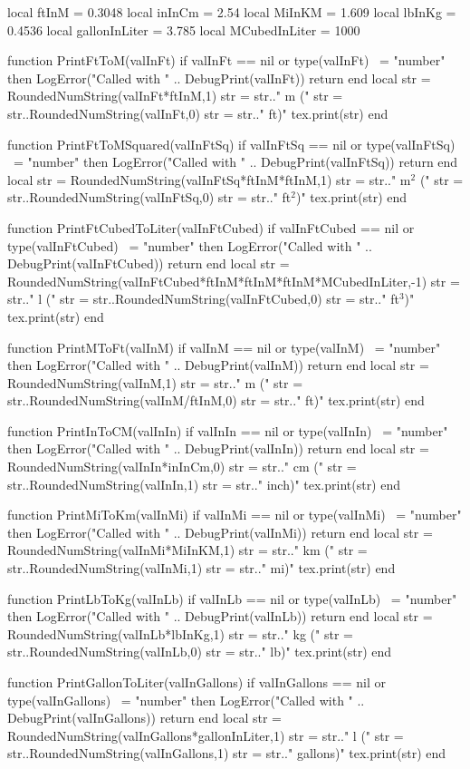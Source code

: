 \begin{luacode}
	local ftInM = 0.3048
	local inInCm = 2.54
	local MiInKM = 1.609
	local lbInKg = 0.4536
	local gallonInLiter = 3.785
	local MCubedInLiter = 1000
	
	function PrintFtToM(valInFt)
		if valInFt == nil or type(valInFt) ~= "number" then
			LogError("Called with " .. DebugPrint(valInFt))
			return
		end
		local str = RoundedNumString(valInFt*ftInM,1)
		str = str.." m ("
		str = str..RoundedNumString(valInFt,0)
		str = str.." ft)"
		tex.print(str)
	end

	function PrintFtToMSquared(valInFtSq)
		if valInFtSq == nil or type(valInFtSq) ~= "number" then
			LogError("Called with " .. DebugPrint(valInFtSq))
			return
		end
		local str = RoundedNumString(valInFtSq*ftInM*ftInM,1)
		str = str.." m$^2$ ("
		str = str..RoundedNumString(valInFtSq,0)
		str = str.." ft$^2$)"
		tex.print(str)
	end

	function PrintFtCubedToLiter(valInFtCubed)
		if valInFtCubed == nil or type(valInFtCubed) ~= "number" then
			LogError("Called with " .. DebugPrint(valInFtCubed))
			return
		end
		local str = RoundedNumString(valInFtCubed*ftInM*ftInM*ftInM*MCubedInLiter,-1)
		str = str.." l ("
		str = str..RoundedNumString(valInFtCubed,0)
		str = str.." ft$^3$)"
		tex.print(str)
	end
	
	function PrintMToFt(valInM)
		if valInM == nil or type(valInM) ~= "number" then
			LogError("Called with " .. DebugPrint(valInM))
			return
		end
		local str = RoundedNumString(valInM,1)
		str = str.." m ("
		str = str..RoundedNumString(valInM/ftInM,0)
		str = str.." ft)"
		tex.print(str)
	end

	function PrintInToCM(valInIn)
		if valInIn == nil or type(valInIn) ~= "number" then
			LogError("Called with " .. DebugPrint(valInIn))
			return
		end
		local str = RoundedNumString(valInIn*inInCm,0)
		str = str.." cm ("
		str = str..RoundedNumString(valInIn,1)
		str = str.." inch)"
		tex.print(str)
	end

	function PrintMiToKm(valInMi)
		if valInMi == nil or type(valInMi) ~= "number" then
			LogError("Called with " .. DebugPrint(valInMi))
			return
		end
		local str = RoundedNumString(valInMi*MiInKM,1)
		str = str.." km ("
		str = str..RoundedNumString(valInMi,1)
		str = str.." mi)"
		tex.print(str)
	end

	function PrintLbToKg(valInLb)
		if valInLb == nil or type(valInLb) ~= "number" then
			LogError("Called with " .. DebugPrint(valInLb))
			return
		end
		local str = RoundedNumString(valInLb*lbInKg,1)
		str = str.." kg ("
		str = str..RoundedNumString(valInLb,0)
		str = str.." lb)"
		tex.print(str)
	end

	function PrintGallonToLiter(valInGallons)
		if valInGallons == nil or type(valInGallons) ~= "number" then
			LogError("Called with " .. DebugPrint(valInGallons))
			return
		end
		local str = RoundedNumString(valInGallons*gallonInLiter,1)
		str = str.." l ("
		str = str..RoundedNumString(valInGallons,1)
		str = str.." gallons)"
		tex.print(str)
	end
\end{luacode}

